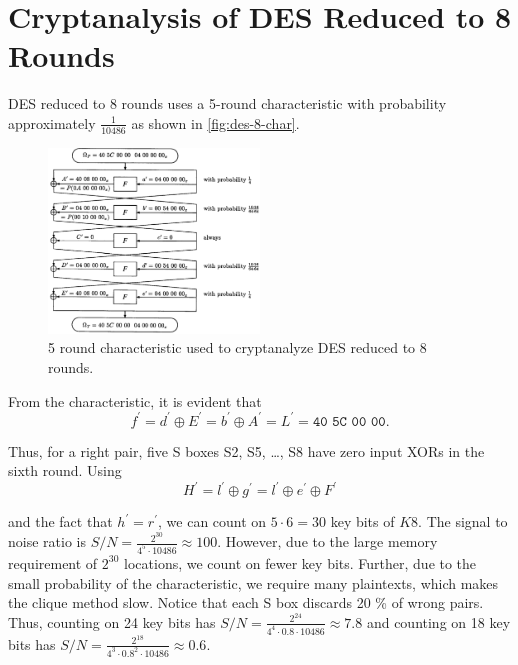 \documentclass[twoside]{article}
\begin{document}



\section{Cryptanalysis of DES Reduced to 8 Rounds}
DES reduced to 8 rounds uses a 5-round characteristic with probability 
approximately \(\frac{1}{10486}\) as shown in \autoref{fig:des-8-char}.

\begin{figure}[!ht]
    \centering
    \includegraphics[width=0.5\textwidth]{images/des_8round_char.png}
    \caption{5 round characteristic used to cryptanalyze DES reduced to 8 rounds.}
    \label{fig:des-8-char}
\end{figure}

From the characteristic, it is evident that
\begin{equation}
    f^\prime = d^\prime \oplus E^\prime = b^\prime \oplus A^\prime = L^\prime = \texttt{40 5C 00 00}.
\end{equation}

Thus, for a right pair, five S boxes S2, S5, \dots, S8 have zero input XORs in
the sixth round. Using
\begin{equation}
    H^\prime = l^\prime \oplus g^\prime = l^\prime \oplus e^\prime \oplus F^\prime
\end{equation}

and the fact that \(h^\prime = r^\prime\), we can count on \(5 \cdot 6 = 30\)
key bits of \(K8\). The signal to noise ratio is \(S/N = \frac{2^{30}}{4^5 \cdot
10486} \approx 100\). However, due to the large memory requirement of \(2^{30}\)
locations, we count on fewer key bits. Further, due to the small probability of
the characteristic, we require many plaintexts, which makes the clique method
slow. Notice that each S box discards 20 \% of wrong pairs. Thus, counting on 24
key bits has \(S/N = \frac{2^{24}}{4^4 \cdot 0.8 \cdot 10486} \approx 7.8\) and
counting on 18 key bits has \(S/N = \frac{2^{18}}{4^3 \cdot 0.8^2 \cdot 10486}
\approx 0.6\).
\end{document}
